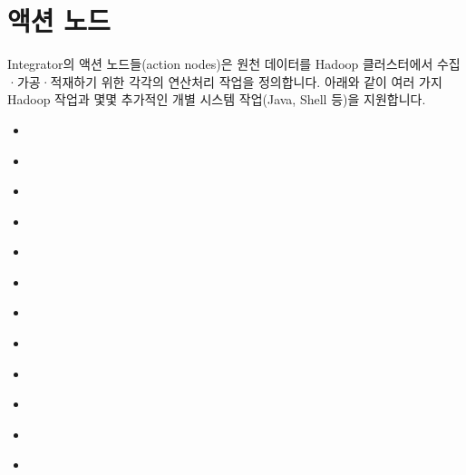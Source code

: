 \documentclass[letterpaper,10pt,english]{sphinxmanual}
\begin{document}
\section{액션 노드}
\label{\detokenize{integrator/part03/tasks:action-nodes}}\label{\detokenize{integrator/part03/tasks:id1}}\label{\detokenize{integrator/part03/tasks::doc}}
Integrator의 액션 노드들(action nodes)은 원천 데이터를 Hadoop 클러스터에서 수집·가공·적재하기 위한 각각의 연산처리 작업을 정의합니다.
아래와 같이 여러 가지 Hadoop 작업과 몇몇 추가적인 개별 시스템 작업(Java, Shell 등)을 지원합니다.
\begin{itemize}
\item {} 
{\hyperref[\detokenize{integrator/part03/tasks:sqoop}]{}}

\item {} 
{\hyperref[\detokenize{integrator/part03/tasks:mr}]{}}

\item {} 
{\hyperref[\detokenize{integrator/part03/tasks:exec}]{}}

\item {} 
{\hyperref[\detokenize{integrator/part03/tasks:java}]{}}

\item {} 
{\hyperref[\detokenize{integrator/part03/tasks:hive-query}]{}}

\item {} 
{\hyperref[\detokenize{integrator/part03/tasks:ssh}]{}}

\item {} 
{\hyperref[\detokenize{integrator/part03/tasks:spark}]{}}

\item {} 
{\hyperref[\detokenize{integrator/part03/tasks:sub-workflow}]{}}

\item {} 
{\hyperref[\detokenize{integrator/part03/tasks:distcp}]{}}

\item {} 
{\hyperref[\detokenize{integrator/part03/tasks:hdfs}]{}}

\item {} 
{\hyperref[\detokenize{integrator/part03/tasks:done}]{}}

\item {} 
{\hyperref[\detokenize{integrator/part03/tasks:druid}]{}}

\end{itemize}
\end{document}
